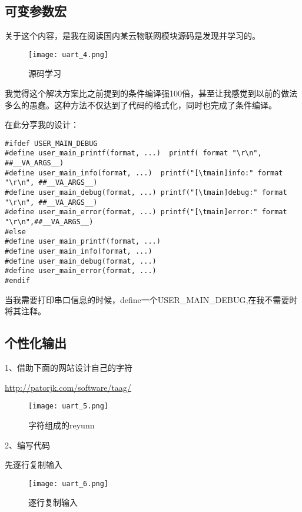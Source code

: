 \documentclass[cn,11pt]{elegantbook}
\begin{document}
\subsection{可变参数宏}

关于这个内容，是我在阅读国内某云物联网模块源码是发现并学习的。

\begin{figure}[htbp]
	\centering
	\texttt{[image: uart\_4.png]}
	\caption{源码学习\label{fig:scatter}}
\end{figure}

我觉得这个解决方案比之前提到的条件编译强100倍，甚至让我感觉到以前的做法多么的愚蠢。这种方法不仅达到了代码的格式化，同时也完成了条件编译。

在此分享我的设计：

\begin{lstlisting}
#ifdef USER_MAIN_DEBUG
#define user_main_printf(format, ...)  printf( format "\r\n", ##__VA_ARGS__)
#define user_main_info(format, ...)  printf("[\tmain]info:" format "\r\n", ##__VA_ARGS__)
#define user_main_debug(format, ...) printf("[\tmain]debug:" format "\r\n", ##__VA_ARGS__)
#define user_main_error(format, ...) printf("[\tmain]error:" format "\r\n",##__VA_ARGS__)
#else
#define user_main_printf(format, ...)
#define user_main_info(format, ...)
#define user_main_debug(format, ...)
#define user_main_error(format, ...)
#endif
\end{lstlisting}

当我需要打印串口信息的时候，define一个USER\_MAIN\_DEBUG,在我不需要时将其注释。

\subsection{个性化输出}

1、借助下面的网站设计自己的字符

\href{http://patorjk.com/software/taag/}{http://patorjk.com/software/taag/}
\begin{figure}[htbp]
	\centering
	\texttt{[image: uart\_5.png]}
	\caption{字符组成的reyunn\label{fig:scatter}}
\end{figure}	

2、编写代码

先逐行复制输入

\begin{figure}[htbp]
	\centering
	\texttt{[image: uart\_6.png]}
	\caption{逐行复制输入\label{fig:scatter}}
\end{figure}	
\end{document}
